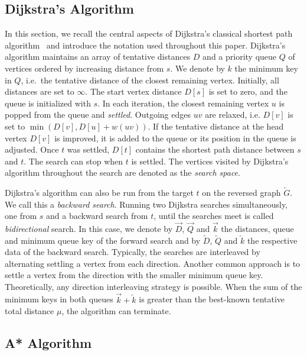 \documentclass[manuscript,review]{acmart}
\begin{document}
\subsection{Dijkstra's Algorithm}

In this section, we recall the central aspects of Dijkstra's classical shortest path algorithm~\cite{d-ntpcg-59} and introduce the notation used throughout this paper.
Dijkstra's algorithm maintains an array of tentative distances $D$ and a priority queue $Q$ of vertices ordered by increasing distance from $s$.
We denote by $k$ the minimum key in $Q$, i.e.\ the tentative distance of the closest remaining vertex.
Initially, all distances are set to $\infty$.
The start vertex distance $D[s]$ is set to zero, and the queue is initialized with $s$.
In each iteration, the closest remaining vertex $u$ is popped from the queue and \emph{settled}.
Outgoing edges $uv$ are relaxed, i.e. $D[v]$ is set to $\min(D[v], D[u] + w(uv))$.
If the tentative distance at the head vertex $D[v]$ is improved, it is added to the queue or its position in the queue is adjusted.
Once $t$ was settled, $D[t]$ contains the shortest path distance between $s$ and $t$.
The search can stop when $t$ is settled.
The vertices visited by Dijkstra's algorithm throughout the search are denoted as the \emph{search space}.

Dijkstra's algorithm can also be run from the target $t$ on the reversed graph $\overleftarrow{G}$.
We call this a \emph{backward search}.
Running two Dijkstra searches simultaneously, one from $s$ and a backward search from $t$, until the searches meet is called \emph{bidirectional} search.
In this case, we denote by $\overrightarrow{D}$, $\overrightarrow{Q}$ and $\overrightarrow{k}$ the distances, queue and minimum queue key of the forward search and by $\overleftarrow{D}$, $\overleftarrow{Q}$ and $\overleftarrow{k}$ the respective data of the backward search.
Typically, the searches are interleaved by alternating settling a vertex from each direction.
Another common approach is to settle a vertex from the direction with the smaller minimum queue key.
Theoretically, any direction interleaving strategy is possible.
When the sum of the minimum keys in both queues $\overrightarrow{k} + \overleftarrow{k}$ is greater than the best-known tentative total distance $\mu$, the algorithm can terminate.

\subsection{A* Algorithm}\label{sec:a_star}
\end{document}
